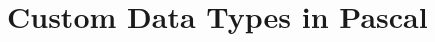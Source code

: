 \cleardoublepage
\def\pageLang{pas}
\section{Custom Data Types in Pascal} %
\label{sec:custom_types_in_pas}






